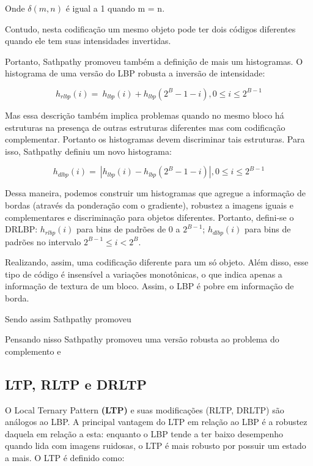 \documentclass[a4paper,twocolumn]{article}
\begin{document}
Onde $\delta(m, n)$ é igual a 1 quando m = n.

Contudo, nesta codificação um mesmo objeto pode ter dois códigos diferentes quando ele tem suas intensidades invertidas. 

Portanto, Sathpathy promoveu também a definição de mais um histogramas. O histograma de uma versão do LBP robusta a inversão de intensidade:

\begin{equation}
    \label{eq:target_cost}
    h_{rlbp}(i) = \displaystyle\ h_{lbp}(i) + h_{lbp}(2^B - 1 - i), 0\leq i \leq 2^{B - 1}
\end{equation}

Mas essa descrição também implica problemas quando no mesmo bloco há estruturas na presença de outras estruturas diferentes mas com codificação complementar. Portanto os histogramas devem discriminar tais estruturas. Para isso, Sathpathy definiu um novo histograma:

\begin{equation}
    \label{eq:target_cost}
    h_{dlbp}(i) = \displaystyle\ |h_{lbp}(i) - h_{lbp}(2^B - 1 - i)|, 0\leq i \leq 2^{B - 1}
\end{equation}

Dessa maneira, podemos construir um histogramas que agregue a informação de bordas (através da ponderação com o gradiente), robustez a imagens iguais e complementares e discriminação para objetos diferentes. Portanto, defini-se o DRLBP: $h_{rlbp}(i)$ para bins de padrões de 0 a $2^{B - 1}$; $h_{dlbp}(i)$ para bins de padrões no intervalo $2^{B-1} \leq i <2^B$.

Realizando, assim, uma codificação diferente para um só objeto. Além disso, esse tipo de código é insensível a variações monotônicas, o que indica apenas a informação de textura de um bloco. Assim, o LBP é pobre em informação de borda.

Sendo assim Sathpathy promoveu 

Pensando nisso Sathpathy promoveu uma versão robusta ao problema do complemento e 


\subsection{LTP, RLTP e DRLTP}
\label{rule_based}

O Local Ternary Pattern \textbf{(LTP)} e suas modificações (RLTP, DRLTP) são análogos ao LBP. A principal vantagem do LTP em relação ao LBP é a robustez daquela em relação a esta: enquanto o LBP tende a ter baixo desempenho quando lida com imagens ruidosas, o LTP é mais robusto por possuir um estado a mais.\cite{han} O LTP é definido como: 
\end{document}
